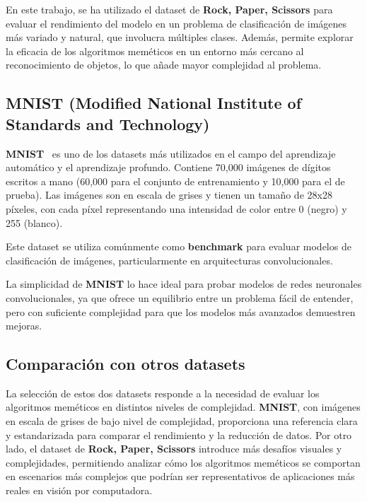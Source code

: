 En este trabajo, se ha utilizado el dataset de \textbf{Rock, Paper, Scissors} para evaluar el rendimiento del modelo en
un problema de clasificación de imágenes más variado y natural, que involucra múltiples clases.
Además, permite explorar la eficacia de los algoritmos meméticos en un entorno más cercano al reconocimiento de
objetos, lo que añade mayor complejidad al problema.

\subsection{MNIST (Modified National Institute of Standards and Technology)}\label{subsec:mnist}
\textbf{MNIST}~\cite{MNIST Dataset} es uno de los datasets más utilizados en el campo del aprendizaje automático y el
aprendizaje profundo.
Contiene 70,000 imágenes de dígitos escritos a mano (60,000 para el conjunto de entrenamiento y 10,000 para el de
prueba).
Las imágenes son en escala de grises y tienen un tamaño de 28x28 píxeles, con cada píxel representando una intensidad
de color entre 0 (negro) y 255 (blanco).

Este dataset se utiliza comúnmente como \textbf{benchmark} para evaluar modelos de clasificación de imágenes,
particularmente en arquitecturas convolucionales.

La simplicidad de \textbf{MNIST} lo hace ideal para probar modelos de redes neuronales convolucionales, ya que ofrece un
equilibrio entre un problema fácil de entender, pero con suficiente complejidad para que los modelos más avanzados
demuestren mejoras.

\subsection{Comparación con otros datasets}\label{subsec:comparacion-con-otros-datasets}
La selección de estos dos datasets responde a la necesidad de evaluar los algoritmos meméticos en distintos niveles de
complejidad.
\textbf{MNIST}, con imágenes en escala de grises de bajo nivel de complejidad, proporciona una referencia clara y
estandarizada para comparar el rendimiento y la reducción de datos.
Por otro lado, el dataset de \textbf{Rock, Paper, Scissors} introduce más desafíos visuales y complejidades,
permitiendo analizar cómo los algoritmos meméticos se comportan en escenarios más complejos que podrían ser
representativos de aplicaciones más reales en visión por computadora.
